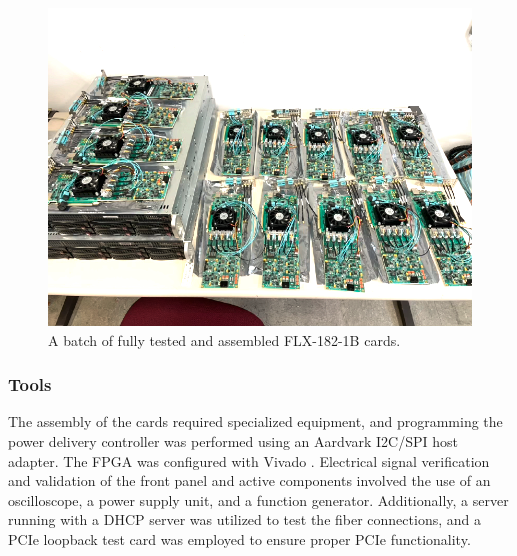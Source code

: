 \begin{figure}[H]
\centering
\includegraphics[width=\textwidth]{images/contributions/felix-cards.png}
\caption{A batch of fully tested and assembled FLX-182-1B cards.}
\label{fig:batch-felix-cards}
\end{figure}

\subsubsection{Tools}

The assembly of the cards required specialized equipment, and programming the power delivery controller was performed using an Aardvark I2C/SPI host adapter. The \acs{FPGA} was configured with Vivado \cite{vivado}. Electrical signal verification and validation of the front panel and active components involved the use of an oscilloscope, a power supply unit, and a function generator. Additionally, a server running with a \acs{DHCP} server was utilized to test the fiber connections, and a \acs{PCIe} loopback test card was employed to ensure proper \acs{PCIe} functionality.

\clearpage

